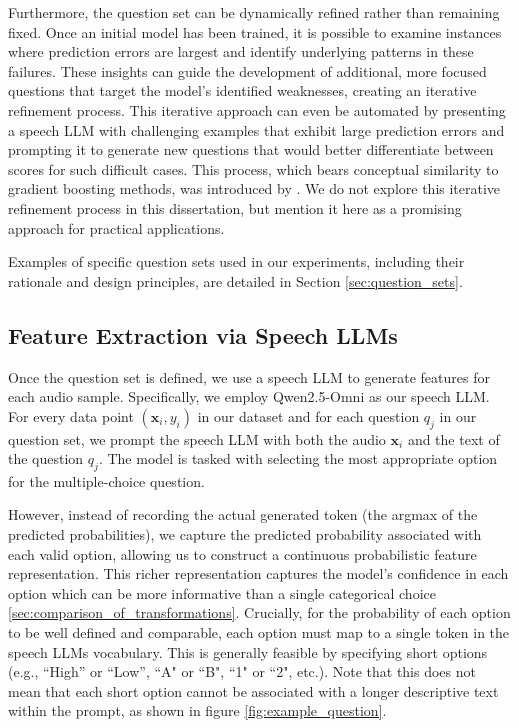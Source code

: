 \documentclass{report}
\begin{document}
Furthermore, the question set can be dynamically refined rather than remaining fixed. Once an initial model has been trained, it is possible to examine instances where prediction errors are largest and identify underlying patterns in these failures. These insights can guide the development of additional, more focused questions that target the model's identified weaknesses, creating an iterative refinement process. This iterative approach can even be automated by presenting a speech LLM with challenging examples that exhibit large prediction errors and prompting it to generate new questions that would better differentiate between scores for such difficult cases. This process, which bears conceptual similarity to gradient boosting methods, was introduced by \citet{benara2024craftinginterpretableembeddingsasking}. We do not explore this iterative refinement process in this dissertation, but mention it here as a promising approach for practical applications.

Examples of specific question sets used in our experiments, including their rationale and design principles, are detailed in Section \ref{sec:question_sets}.

\subsection{Feature Extraction via Speech LLMs}
\label{subsec:feature_extraction}
Once the question set is defined, we use a speech LLM to generate features for each audio sample. Specifically, we employ Qwen2.5-Omni \citep{xu2025qwen25omnitechnicalreport} as our speech LLM. For every data point $(\mathbf{x}_i, y_i)$ in our dataset and for each question $q_j$ in our question set, we prompt the speech LLM with both the audio $\mathbf{x}_i$ and the text of the question $q_j$. The model is tasked with selecting the most appropriate option for the multiple-choice question. 

However, instead of recording the actual generated token (the argmax of the predicted probabilities), we capture the predicted probability associated with each valid option, allowing us to construct a continuous probabilistic feature representation. This richer representation captures the model's confidence in each option which can be more informative than a single categorical choice \ref{sec:comparison_of_transformations}. Crucially, for the probability of each option to be well defined and comparable, each option must map to a single token in the speech LLMs vocabulary. This is generally feasible by specifying short options (e.g., ``High'' or ``Low'', ``A" or ``B", ``1" or ``2", etc.). Note that this does not mean that each short option cannot be associated with a longer descriptive text within the prompt, as shown in figure \ref{fig:example_question}.
\end{document}
